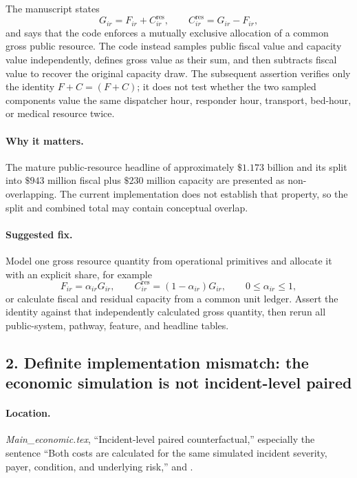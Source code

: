 \documentclass[11pt]{article}
\begin{document}
The manuscript states
\begin{equation}
G_{ir}=F_{ir}+C^{\mathrm{res}}_{ir},\qquad
C^{\mathrm{res}}_{ir}=G_{ir}-F_{ir},
\tag{as printed in the manuscript}
\label{eq:publicpartition-review}
\end{equation}
and says that the code enforces a mutually exclusive allocation of a common
gross public resource.  The code instead samples public fiscal value and
capacity value independently, defines gross value as their sum, and then
subtracts fiscal value to recover the original capacity draw.  The subsequent
assertion verifies only the identity
\(F+C=(F+C)\); it does not test whether the two sampled components value the
same dispatcher hour, responder hour, transport, bed-hour, or medical resource
twice.

\paragraph{Why it matters.}
The mature public-resource headline of approximately \(\$1.173\) billion and
its split into \(\$943\) million fiscal plus \(\$230\) million capacity are
presented as non-overlapping.  The current implementation does not establish
that property, so the split and combined total may contain conceptual overlap.

\paragraph{Suggested fix.}
Model one gross resource quantity from operational primitives and allocate it
with an explicit share, for example
\[
F_{ir}=\alpha_{ir}G_{ir},\qquad
C^{\mathrm{res}}_{ir}=(1-\alpha_{ir})G_{ir},\qquad 0\leq\alpha_{ir}\leq1,
\]
or calculate fiscal and residual capacity from a common unit ledger.  Assert
the identity against that independently calculated gross quantity, then rerun
all public-system, pathway, feature, and headline tables.

\subsection*{2. Definite implementation mismatch: the economic simulation is not incident-level paired}

\paragraph{Location.}
\emph{Main\_economic.tex}, ``Incident-level paired counterfactual,'' especially
the sentence ``Both costs are calculated for the same simulated incident
severity, payer, condition, and underlying risk,'' and
.
\end{document}
